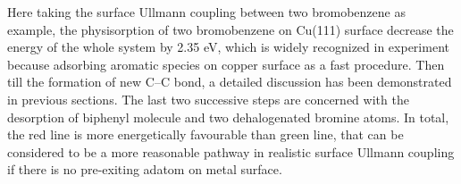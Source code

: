 \documentclass[%
 reprint,
 amsmath,amssymb,
 aps,
prb,
]{revtex4-1}
\begin{document}
Here taking the surface Ullmann coupling between two bromobenzene as example, the physisorption of two bromobenzene on Cu(111) surface decrease the energy of the whole system by 2.35 eV, which is widely recognized in experiment because adsorbing aromatic species on copper surface as a fast procedure. 
Then till the formation of new C--C bond, a detailed discussion has been demonstrated in previous sections. The last two successive steps are concerned with the desorption of biphenyl molecule and two dehalogenated bromine atoms. 
In total, the red line is more energetically favourable than green line, that can be considered to be a more reasonable pathway in realistic surface Ullmann coupling if there is no pre-exiting adatom on metal surface.



\end{document}
